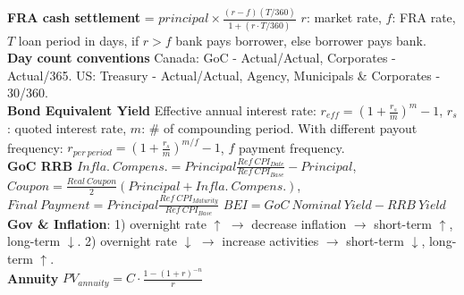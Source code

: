 \documentclass[10pt,landscape]{article}
\begin{document}
\raggedright
\footnotesize
\begin{multicols}{3}


\setlength{\premulticols}{1pt}
\setlength{\postmulticols}{1pt}
\setlength{\multicolsep}{1pt}
\setlength{\columnsep}{2pt}

{\bf FRA cash settlement} = $principal \times \frac{(r-f)(T/360)}{1+(r \cdot T/360)}$ $r$: market rate, $f$: FRA rate, $T$ loan period in days, if $r>f$ bank pays borrower, else borrower pays bank.\\
{\bf Day count conventions} Canada: GoC - Actual/Actual, Corporates - Actual/365. US: Treasury - Actual/Actual, Agency, Municipals \& Corporates - 30/360.\\
{\bf Bond Equivalent Yield} Effective annual interest rate: $r_{eff} = (1+\frac{r_s}{m})^m - 1$, $r_s$: quoted interest rate, $m$: \# of compounding period. With different payout frequency: $r_{per\ period} = (1+\frac{r_s}{m})^{m/f}-1$, $f$ payment frequency.\\
{\bf GoC RRB} $Infla.\ Compens. = Principal\frac{{Ref\ CPI}_{Date}}{{Ref\ CPI}_{Base}} - Principal$, $Coupon = \frac{Real\ Coupon}{2} (Principal + Infla.\ Compens.)$, $Final\ Payment = Principal\frac{{Ref\ CPI}_{Maturity}}{{Ref\ CPI}_{Base}}$ $BEI = GoC\ Nominal\ Yield - RRB\ Yield$\\
{\bf Gov \& Inflation}: 1) overnight rate $\uparrow$ $\rightarrow$ decrease inflation $\rightarrow$ short-term $\uparrow$, long-term $\downarrow$. 2) overnight rate $\downarrow$ $\rightarrow$ increase activities $\rightarrow$ short-term $\downarrow$, long-term $\uparrow$.\\
{\bf Annuity} $PV_{annuity} = C \cdot \frac{1-(1+r)^{-n}}{r}$\\


\end{multicols}
\end{document}
